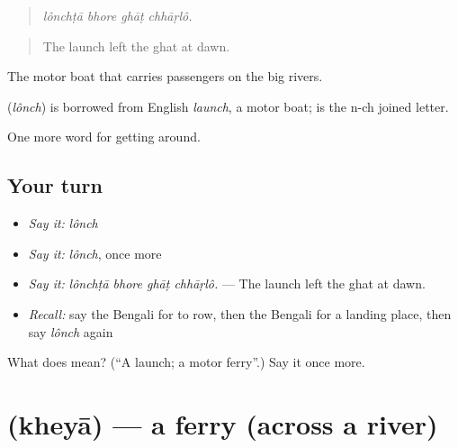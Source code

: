 \begin{quote}
   
\end{quote}

\begin{quote}
\emph{lônchṭā bhore ghāṭ chhāṛlô.}
\end{quote}

\begin{quote}
The launch left the ghat at dawn.
\end{quote}

The motor boat that carries passengers on the big rivers.

\begin{cousinweb}
\textbf{} (\emph{lônch}) is borrowed from English \emph{launch}, a motor boat;  is the n-ch joined letter.
\end{cousinweb}

\begin{grammarlens}[title={What you've built}]
One more word for getting around.
\end{grammarlens}

\subsection*{Your turn}
\begin{itemize}
\raggedright
  \item \emph{Say it:} \emph{lônch}
  \item \emph{Say it:} \emph{lônch}, once more
  \item \emph{Say it:} \emph{lônchṭā bhore ghāṭ chhāṛlô.} — The launch left the ghat at dawn.
  \item \emph{Recall:} say the Bengali for to row, then the Bengali for a landing place, then say \emph{lônch} again
\end{itemize}

\begin{tcolorbox}[breakable,colback=teal!4,colframe=teal!35!black,title={Before you move on}]
What does  mean? (\textquotedblleft{}A launch; a motor ferry\textquotedblright{}.) Say it once more.
\end{tcolorbox}
\section[\texorpdfstring{\bn{খেয়া} (kheyā)}{খেয়া (kheyā)}]{ (kheyā) — a ferry (across a river)}

\label{lesson:BN-C397-kheya}



